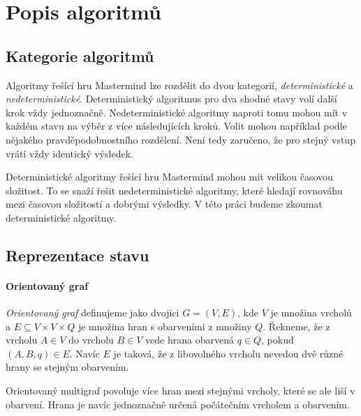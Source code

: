 \chapter{Popis algoritmů}
\section{Kategorie algoritmů}
Algoritmy řešící hru Mastermind lze rozdělit do dvou kategorií, \emph{deterministické} a \emph{nedeterministické}. Deterministický algoritmus pro dva shodné stavy volí další krok vždy jednoznačně. 
Nedeterministické algoritmy naproti tomu mohou mít v každém stavu na výběr z více následujících kroků. Volit mohou například podle nějakého pravděpodobnostního rozdělení. Není tedy zaručeno, že pro stejný vstup vrátí vždy identický výsledek.

Deterministické algoritmy řešící hru Mastermind mohou mít velikou časovou složitost. To se snaží řešit nedeterministické algoritmy, které hledají rovnováhu mezi časovou složitostí a dobrými výsledky. 
V této práci budeme zkoumat deterministické algoritmy. 


\section{Reprezentace stavu}


\subsubsection{Orientovaný graf}

\begin{definice}
    \emph{Orientovaný graf} definujeme jako dvojici $G = (V,E)$, kde $V$ je množina vrcholů a $E \subseteq V\times V \times Q$ je množina hran s obarveními z množiny $Q$. 
    Řekneme, že z vrcholu $A \in V$ do vrcholu $B \in V$ vede hrana obarvená $q \in Q$, pokud $(A,B,q) \in E$. Navíc $E$ je taková, že z libovolného vrcholu nevedou dvě různé hrany se stejným obarvením.
\end{definice}
\begin{pozn}
    Orientovaný multigraf povoluje více hran mezi stejnými vrcholy, které se ale liší v obarvení. Hrana je navíc jednoznačně určená počátečním vrcholem a obarvením.
\end{pozn}

